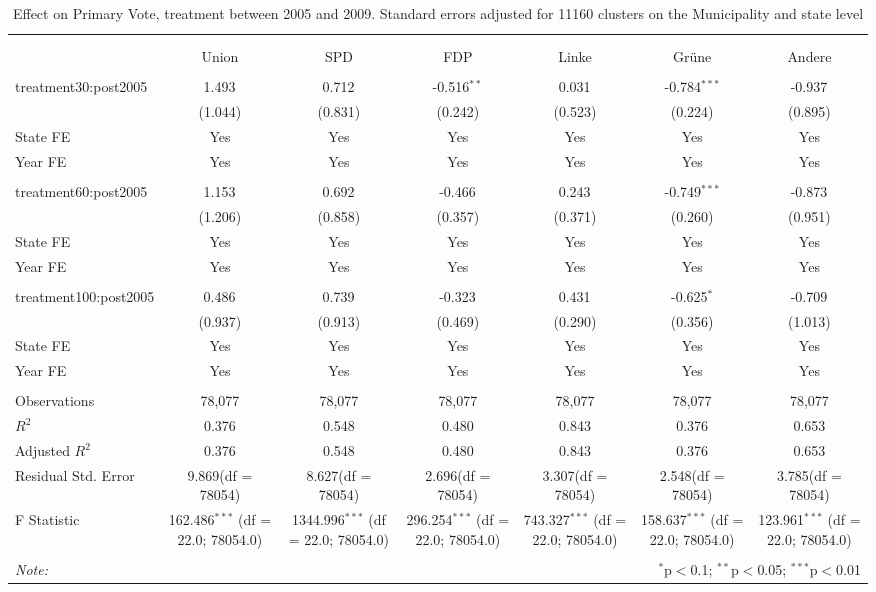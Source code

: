 \documentclass[12pt]{article}
\begin{document}
 
\begin{table}[!htbp] \centering
  \caption{Effect on Primary Vote, treatment between 2005 and 2009. Standard errors adjusted for 11160 clusters on the Municipality and state level}
\begin{tabular}{@{\extracolsep{5pt}}lcccccc}
\\[-1.8ex]\hline
\hline \\[-1.8ex]
\\[-1.8ex] & \multicolumn{1}{c}{Union} & \multicolumn{1}{c}{SPD} & \multicolumn{1}{c}{FDP} & \multicolumn{1}{c}{Linke} & \multicolumn{1}{c}{Grüne} & \multicolumn{1}{c}{Andere}  \\
\hline \\[-1.8ex]
 treatment30:post2005 & 1.493$^{}$ & 0.712$^{}$ & -0.516$^{**}$ & 0.031$^{}$ & -0.784$^{***}$ & -0.937$^{}$ \\
  & (1.044) & (0.831) & (0.242) & (0.523) & (0.224) & (0.895) \\
 State FE & Yes & Yes & Yes & Yes & Yes & Yes \\
 Year FE & Yes & Yes & Yes & Yes & Yes & Yes \\
\hline \\[-1.8ex]
 treatment60:post2005 & 1.153$^{}$ & 0.692$^{}$ & -0.466$^{}$ & 0.243$^{}$ & -0.749$^{***}$ & -0.873$^{}$ \\
  & (1.206) & (0.858) & (0.357) & (0.371) & (0.260) & (0.951) \\
 State FE & Yes & Yes & Yes & Yes & Yes & Yes \\
 Year FE & Yes & Yes & Yes & Yes & Yes & Yes \\
\hline \\[-1.8ex]
 treatment100:post2005 & 0.486$^{}$ & 0.739$^{}$ & -0.323$^{}$ & 0.431$^{}$ & -0.625$^{*}$ & -0.709$^{}$ \\
  & (0.937) & (0.913) & (0.469) & (0.290) & (0.356) & (1.013) \\
 State FE & Yes & Yes & Yes & Yes & Yes & Yes \\
 Year FE & Yes & Yes & Yes & Yes & Yes & Yes \\
\hline \\[-1.8ex]
 Observations & 78,077 & 78,077 & 78,077 & 78,077 & 78,077 & 78,077 \\
 $R^2$ & 0.376 & 0.548 & 0.480 & 0.843 & 0.376 & 0.653 \\
 Adjusted $R^2$ & 0.376 & 0.548 & 0.480 & 0.843 & 0.376 & 0.653 \\
 Residual Std. Error & 9.869(df = 78054) & 8.627(df = 78054) & 2.696(df = 78054) & 3.307(df = 78054) & 2.548(df = 78054) & 3.785(df = 78054)  \\
 F Statistic & 162.486$^{***}$ (df = 22.0; 78054.0) & 1344.996$^{***}$ (df = 22.0; 78054.0) & 296.254$^{***}$ (df = 22.0; 78054.0) & 743.327$^{***}$ (df = 22.0; 78054.0) & 158.637$^{***}$ (df = 22.0; 78054.0) & 123.961$^{***}$ (df = 22.0; 78054.0) \\
\hline
\hline \\[-1.8ex]
\textit{Note:} & \multicolumn{6}{r}{$^{*}$p$<$0.1; $^{**}$p$<$0.05; $^{***}$p$<$0.01} \\
\end{tabular}
\end{table}
\end{document}
